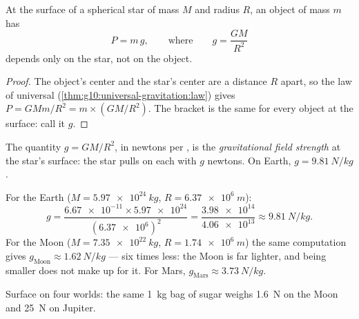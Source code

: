 \begin{proposition}\label{prop:g10:universal-gravitation:surfaceg}
At the surface of a spherical star of mass $M$ and radius $R$, an object
of mass $m$ has 
\[
P = m\,g,
\qquad\text{where}\qquad
g = \frac{G M}{R^2}
\]
depends only on the star, not on the object.
\end{proposition}

\begin{proof}
The object's center and the star's center are a distance $R$ apart, so
the law of universal 
(\cref{thm:g10:universal-gravitation:law}) gives
$P = G M m / R^2 = m \times \left(G M / R^2\right)$. The bracket is the
same for every object at the surface: call it $g$.
\end{proof}

\begin{definition}\label{def:g10:universal-gravitation:fieldstrength}
The quantity $g = G M / R^2$, in newtons per , is the
\emph{gravitational field strength}
at the star's surface: the star pulls on each  with $g$ newtons.
On Earth, $g = \qty{9.81}{N/kg}$.
\end{definition}

\begin{example}[Computing $g$]\label{ex:g10:universal-gravitation:gvalues}
For the Earth ($M = \qty{5.97e24}{kg}$, $R = \qty{6.37e6}{m}$):
\[
g = \frac{\num{6.67e-11} \times \num{5.97e24}}{(\num{6.37e6})^2}
= \frac{\num{3.98e14}}{\num{4.06e13}}
\approx \qty{9.81}{N/kg}.
\]
For the Moon ($M = \qty{7.35e22}{kg}$, $R = \qty{1.74e6}{m}$) the same
computation gives $g_{\text{Moon}} \approx \qty{1.62}{N/kg}$ --- six
times less: the Moon is far lighter, and being smaller does not make up
for it. For Mars, $g_{\text{Mars}} \approx \qty{3.73}{N/kg}$.
\end{example}

\begin{omfigure}

{\small Surface  on four worlds: the same
\qty{1}{kg} bag of sugar weighs \qty{1.6}{N} on the Moon and
\qty{25}{N} on Jupiter.}
\end{omfigure}

